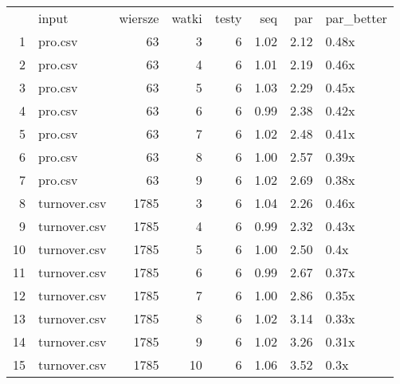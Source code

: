 \begin{table}[ht]
\centering
\begin{tabular}{rlrrrrrl}
  & input & wiersze & watki & testy & seq & par & par\_better \\ 
 1 & pro.csv &  63 &   3 &   6 & 1.02 & 2.12 & 0.48x \\ 
   \hline
2 & pro.csv &  63 &   4 &   6 & 1.01 & 2.19 & 0.46x \\ 
   \hline
3 & pro.csv &  63 &   5 &   6 & 1.03 & 2.29 & 0.45x \\ 
   \hline
4 & pro.csv &  63 &   6 &   6 & 0.99 & 2.38 & 0.42x \\ 
   \hline
5 & pro.csv &  63 &   7 &   6 & 1.02 & 2.48 & 0.41x \\ 
   \hline
6 & pro.csv &  63 &   8 &   6 & 1.00 & 2.57 & 0.39x \\ 
   \hline
7 & pro.csv &  63 &   9 &   6 & 1.02 & 2.69 & 0.38x \\ 
   \hline
8 & turnover.csv & 1785 &   3 &   6 & 1.04 & 2.26 & 0.46x \\ 
   \hline
9 & turnover.csv & 1785 &   4 &   6 & 0.99 & 2.32 & 0.43x \\ 
   \hline
10 & turnover.csv & 1785 &   5 &   6 & 1.00 & 2.50 & 0.4x \\ 
   \hline
11 & turnover.csv & 1785 &   6 &   6 & 0.99 & 2.67 & 0.37x \\ 
   \hline
12 & turnover.csv & 1785 &   7 &   6 & 1.00 & 2.86 & 0.35x \\ 
   \hline
13 & turnover.csv & 1785 &   8 &   6 & 1.02 & 3.14 & 0.33x \\ 
   \hline
14 & turnover.csv & 1785 &   9 &   6 & 1.02 & 3.26 & 0.31x \\ 
   \hline
15 & turnover.csv & 1785 &  10 &   6 & 1.06 & 3.52 & 0.3x \\ 
   \hline
\end{tabular}
\end{table}
